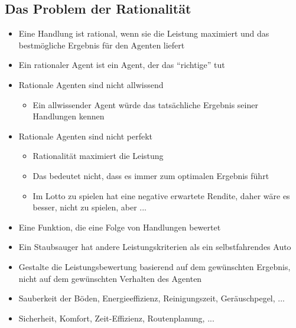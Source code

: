 \subsection{Das Problem der Rationalität}
\begin{itemize}
    \item Eine Handlung ist rational, wenn sie die Leistung maximiert und das bestmögliche Ergebnis für den Agenten liefert
    \item Ein rationaler Agent ist ein Agent, der das \enquote{richtige} tut
\end{itemize}
\begin{itemize}
    \item {} Rationale Agenten sind nicht allwissend
    \begin{itemize}
        \item Ein allwissender Agent würde das tatsächliche Ergebnis seiner Handlungen kennen
    \end{itemize}
    \item Rationale Agenten sind nicht perfekt
    \begin{itemize}
        \item Rationalität maximiert die  Leistung
        \item Das bedeutet nicht, dass es immer zum optimalen Ergebnis führt
        \item {} Im Lotto zu spielen hat eine negative erwartete Rendite, daher wäre es besser, nicht zu spielen, aber ...
    \end{itemize}
\end{itemize}
\begin{itemize}
    \item Eine Funktion, die eine Folge von Handlungen bewertet
    \item {} Ein Staubsauger hat andere Leistungskriterien als ein selbstfahrendes Auto
\end{itemize}
\begin{itemize}
    \item Gestalte die Leistungsbewertung basierend auf dem gewünschten Ergebnis, nicht auf dem gewünschten Verhalten des Agenten
\end{itemize}
\begin{itemize}
    \item {} Sauberkeit der Böden, Energieeffizienz, Reinigungszeit, Geräuschpegel, ...
    \item {} Sicherheit, Komfort, Zeit-Effizienz, Routenplanung, ...
\end{itemize}
\clearpage
